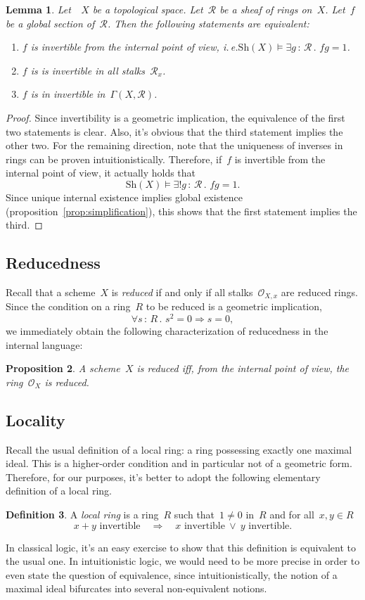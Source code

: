 \documentclass[10pt]{amsart}
\makeatletter
\theoremstyle{definition}
\newtheorem{defn}{Definition}[section]
\theoremstyle{plain}
\newtheorem{prop}[defn]{Proposition}
\newtheorem{lemma}[defn]{Lemma}
\theoremstyle{remark}
\renewcommand{\O}{\mathcal{O}}
\newcommand{\R}{\mathcal{R}}
\newcommand{\Sh}{\mathrm{Sh}}
\newcommand{\?}{\,{:}\,}
\renewcommand{\_}{\mathpunct{.}\,}
\newcommand{\ie}{i.\,e.\@\xspace}
\makeatother
\begin{document}
\begin{lemma}Let~~$X$ be a topological space. Let~$\R$ be a sheaf of rings
on~$X$. Let~$f$ be a global section of~$\R$. Then the following statements are
equivalent:
\begin{enumerate}
\item $f$ is invertible from the internal point of view, \ie $\Sh(X) \models
\exists g\?\R\_ fg = 1$.
\item $f$ is is invertible in all stalks~$\R_x$.
\item $f$ is in invertible in~$\Gamma(X,\R)$.
\end{enumerate}
\end{lemma}
\begin{proof}Since invertibility is a geometric implication, the equivalence of
the first two statements is clear. Also, it's obvious that the third statement
implies the other two. For the remaining direction, note that the
uniqueness of inverses in rings can be proven intuitionistically. Therefore, if~$f$ is invertible
from the internal point of view, it actually holds that
\[ \Sh(X) \models \exists! g\?\R\_ fg = 1. \]
Since unique internal existence implies global existence
(proposition~\ref{prop:simplification}), this shows that the first statement
implies the third.
\end{proof}


\subsection{Reducedness} Recall that a scheme~$X$ is \emph{reduced} if and only
if all stalks~$\O_{X,x}$ are reduced rings. Since the condition on a ring~$R$
to be reduced is a geometric implication,
\[ \forall s\?R\_ s^2 = 0 \Longrightarrow s = 0, \]
we immediately obtain the following characterization of reducedness in the
internal language:
\begin{prop}A scheme~$X$ is reduced iff, from the internal point of view, the
ring~$\O_X$ is reduced.\end{prop}


\subsection{Locality} Recall the usual definition of a local ring: a ring
possessing exactly one maximal ideal. This is a higher-order condition and in
particular not of a geometric form. Therefore, for our purposes, it's better to
adopt the following elementary definition of a local ring.
\begin{defn}A \emph{local ring} is a ring~$R$ such that~$1 \neq 0$ in~$R$ and
for all~$x,y \in R$
\[ \text{$x+y$ invertible} \quad\Longrightarrow\quad
  \text{$x$ invertible}\ \vee\ \text{$y$ invertible}. \]
\end{defn}
In classical logic, it's an easy exercise to show that this definition is
equivalent to the usual one. In intuitionistic logic, we would need to be
more precise in order to even state the question of equivalence, since
intuitionistically, the notion of a maximal ideal bifurcates into several
non-equivalent notions.
\end{document}
